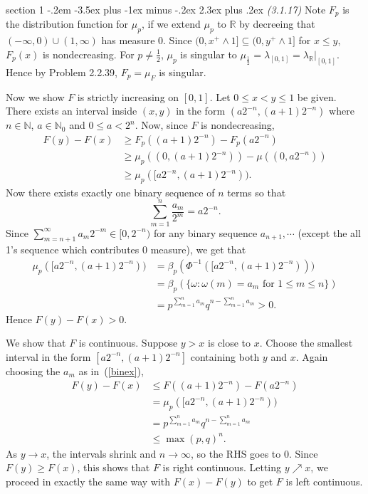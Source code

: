 \documentclass[12pt]{article}
\makeatletter
\theoremstyle{norm}
\newcommand{\N}[0]{\mathbb{N}}
\newcommand{\R}[0]{\mathbb{R}}
\newcommand{\rc}[1]{\frac{1}{#1}}
\newcommand{\subeq}[0]{\subseteq}
\newcommand{\be}[0]{\beta}
\newcommand{\la}[0]{\lambda}
\newcommand{\om}[0]{\omega}
\newcommand{\iy}[0]{\infty}
\newenvironment{problem}{\@startsection
       {section}
       {1}
       {-.2em}
       {-3.5ex plus -1ex minus -.2ex}
       {2.3ex plus .2ex}
       {\pagebreak[3]%
       \large\bf\noindent{Problem }
       }
       }
       {%
       }
\makeatother
\begin{document}
\begin{problem}{\it(3.1.17)}
Note $F_p$ is the distribution function for $\mu_p$, if we extend $\mu_p$ to $\R$ by decreeing that $(-\iy,0)\cup (1,\iy)$ has measure 0. Since $(0,x^+\wedge 1]\subeq (0,y^+\wedge 1]$ for $x\le y$, $F_p(x)$ is nondecreasing. %
For $p\neq \rc 2$, $\mu_p$ is singular to $\mu_{\rc 2}=\la_{[0,1]}=\la_{\R}|_{[0,1]}$. Hence by Problem 2.2.39, $F_p=\mu_F$ is singular. 

Now we show $F$ is strictly increasing on $[0,1]$. Let $0\le x<y\le 1$ be given. There exists an interval inside $(x,y)$ in the form $(a2^{-n},(a+1)2^{-n})$ where $n\in \N$, $a\in \N_0$ and $0\le a< 2^n$. Now, since $F$ is nondecreasing,
\begin{align*}
F(y)-F(x)&\ge F_p((a+1)2^{-n})-F_p(a2^{-n})\\
&\ge \mu_p((0,(a+1)2^{-n}))-\mu((0,a2^{-n}))\\
&\ge \mu_p([a2^{-n},(a+1)2^{-n})).
\end{align*}
Now there exists exactly one binary sequence of $n$ terms so that
\begin{equation}\label{binex}
\sum_{m=1}^n\frac{a_m}{2^m}=a2^{-n}.
\end{equation}
Since $\sum_{m=n+1}^{\iy} a_{m}{2^{-m}}\in [0, 2^{-n})$ for any binary sequence $a_{n+1},\cdots$ (except the all 1's sequence which contributes 0 measure), we get that 
\begin{align*}
\mu_p([a2^{-n},(a+1)2^{-n}))&=\be_p(\Phi^{-1}([a2^{-n},(a+1)2^{-n})))\\
&=\be_p(\{\om:\om(m)=a_m\text{ for }1\le m\le n\})\\
&=p^{\sum_{m=1}^n a_m}q^{n-\sum_{m=1}^n a_m}>0.
\end{align*}
Hence $F(y)-F(x)>0$.%

We show that $F$ is continuous. Suppose $y>x$ is close to $x$. Choose the smallest interval in the form $[a2^{-n},(a+1)2^{-n}]$ containing both $y$ and $x$. Again choosing the $a_m$ as in~(\ref{binex}),
\begin{align*}
F(y)-F(x)&\le F((a+1)2^{-n})-F(a2^{-n})\\
&=\mu_p([a2^{-n},(a+1)2^{-n}))\\
&=p^{\sum_{m=1}^n a_m}q^{n-\sum_{m=1}^n a_m}\\
&\le\max(p,q)^n.
\end{align*}
As $y\to x$, the intervals shrink and $n\to \iy$, so the RHS goes to 0. Since $F(y)\ge F(x)$, this shows that $F$ is right continuous. Letting $y\nearrow x$, we proceed in exactly the same way with $F(x)-F(y)$ to get $F$ is left continuous.
\end{problem}
\end{document}
